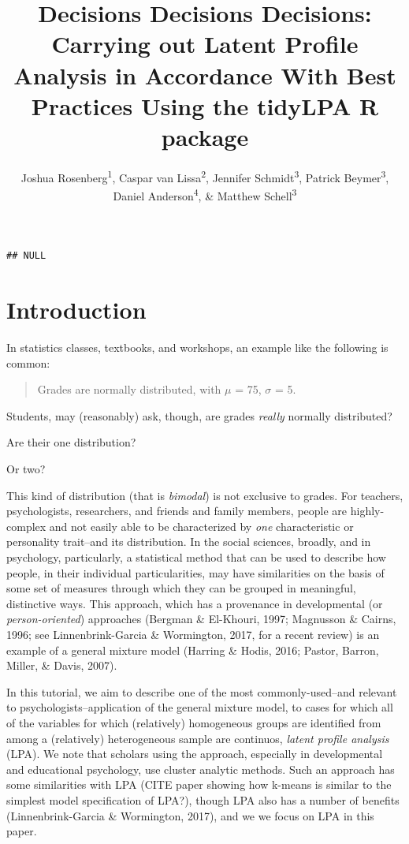 \documentclass[
  english,
  man]{apa6}
\author{Joshua Rosenberg\textsuperscript{1}, Caspar van Lissa\textsuperscript{2}, Jennifer Schmidt\textsuperscript{3}, Patrick Beymer\textsuperscript{3}, Daniel Anderson\textsuperscript{4}, \& Matthew Schell\textsuperscript{3}}
\affiliation{
\vspace{0.5cm}
\textsuperscript{1} University of Tennessee, Knoxville\\\textsuperscript{2} Utrecht University\\\textsuperscript{3} Michigan State University\\\textsuperscript{4} University of Oregon\\\textsuperscript{5} }
\title{Decisions Decisions Decisions: Carrying out Latent Profile Analysis in Accordance With Best Practices Using the tidyLPA R package}
\date{}
\begin{document}
\maketitle

\begin{verbatim}
## NULL
\end{verbatim}

\hypertarget{introduction}{%
\section{Introduction}\label{introduction}}

In statistics classes, textbooks, and workshops, an example like the following is common:

\begin{quote}
Grades are normally distributed, with \(\mu\) = 75, \(\sigma\) = 5.
\end{quote}

Students, may (reasonably) ask, though, are grades \emph{really} normally distributed?

Are their one distribution?

Or two?

This kind of distribution (that is \emph{bimodal}) is not exclusive to grades. For
teachers, psychologists, researchers, and friends and family members, people are
highly-complex and not easily able to be characterized by \emph{one} characteristic
or personality trait--and its distribution. In the social sciences, broadly, and
in psychology, particularly, a statistical method that can be used to describe
how people, in their individual particularities, may have similarities on the
basis of some set of measures through which they can be grouped in meaningful,
distinctive ways. This approach, which has a provenance in developmental (or
\emph{person-oriented}) approaches (Bergman \& El-Khouri, 1997; Magnusson \&
Cairns, 1996; see Linnenbrink-Garcia \& Wormington, 2017, for a recent review) is
an example of a general mixture model (Harring \& Hodis, 2016; Pastor, Barron,
Miller, \& Davis, 2007).

In this tutorial, we aim to describe one of the most commonly-used--and relevant
to psychologists--application of the general mixture model, to cases for which
all of the variables for which (relatively) homogeneous groups are identified
from among a (relatively) heterogeneous sample are continuos, \emph{latent profile
analysis} (LPA). We note that scholars using the approach, especially in
developmental and educational psychology, use cluster analytic methods. Such an
approach has some similarities with LPA (CITE paper showing how k-means is
similar to the simplest model specification of LPA?), though LPA also has a
number of benefits (Linnenbrink-Garcia \& Wormington, 2017), and we we focus on
LPA in this paper.
\end{document}
